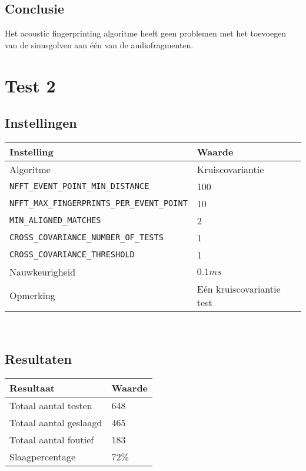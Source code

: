 \subsection*{Conclusie}

Het acoustic fingerprinting algoritme heeft geen problemen met het toevoegen van de sinusgolven aan één van de audiofragmenten.

\section*{Test 2}

\subsection*{Instellingen}

\begin{tabular}{ l  l}
	\hline
	\textbf{Instelling} & \textbf{Waarde} \\
	\hline
	Algoritme & Kruiscovariantie \\
	\texttt{NFFT\_EVENT\_POINT\_MIN\_DISTANCE} & 100 \\
	\texttt{NFFT\_MAX\_FINGERPRINTS\_PER\_EVENT\_POINT} & 10 \\
	\texttt{MIN\_ALIGNED\_MATCHES} & 2 \\
	\texttt{CROSS\_COVARIANCE\_NUMBER\_OF\_TESTS} & 1 \\
	\texttt{CROSS\_COVARIANCE\_THRESHOLD} & 1 \\
	Nauwkeurigheid & $0.1ms$ \\
	Opmerking & Eén kruiscovariantie test \\
\end{tabular}\\

\subsection*{Resultaten}

\begin{tabular}{ l  l}
	\hline
	\textbf{Resultaat} & \textbf{Waarde} \\
	\hline
	Totaal aantal testen & 648 \\
	Totaal aantal geslaagd & 465 \\
	Totaal aantal foutief & 183 \\
	Slaagpercentage & 72\% \\
\end{tabular}\\

